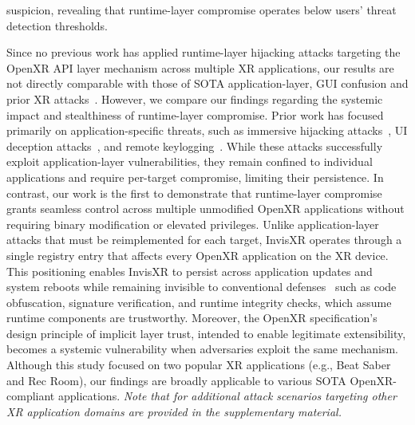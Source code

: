 \documentclass[letterpaper,twocolumn,10pt]{article}
\begin{document}
suspicion, revealing that runtime-layer compromise operates below users' threat detection thresholds.


Since no previous work has applied runtime-layer hijacking attacks targeting the OpenXR API layer mechanism across multiple XR applications, our results are not directly comparable with those of SOTA application-layer, GUI confusion and prior XR attacks~\cite{yang2024inception, lee2025illusion, su2024remote, nair2022exploring,shi2021face,ye2025bpsniff,xiu2025detecting,huang2012clickjacking,fratantonio2017cloak,ren2017windowguard}. However, we compare our findings regarding the systemic impact and stealthiness of runtime-layer compromise. Prior work has focused primarily on application-specific threats, such as immersive hijacking attacks~\cite{yang2024inception}, UI deception attacks~\cite{lee2025illusion}, and remote keylogging~\cite{su2024remote}. While these attacks successfully exploit application-layer vulnerabilities, they remain confined to individual applications and require per-target compromise, limiting their persistence. In contrast, our work is the first to demonstrate that runtime-layer compromise grants seamless control across multiple unmodified OpenXR applications without requiring binary modification or elevated privileges. Unlike application-layer attacks that must be reimplemented for each target,  InvisXR operates through a single registry entry that affects every OpenXR application on the XR device. This positioning enables InvisXR to persist across application updates and system reboots while remaining invisible to conventional defenses~\cite{guo2024empirical, yang2024inception} such as code obfuscation, signature verification, and runtime integrity checks, which assume runtime components are trustworthy. Moreover, the OpenXR specification's design principle of implicit layer trust, intended to enable legitimate extensibility, becomes a systemic vulnerability when adversaries exploit the same mechanism. Although this study focused on two popular XR applications (e.g.,  Beat Saber and Rec Room), our findings are broadly applicable to various SOTA OpenXR-compliant applications. \textit{Note that for additional attack scenarios targeting other XR application domains are provided in the supplementary material.}  
\end{document}
